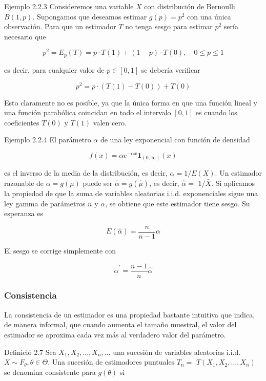 \documentclass[
]{article}
\begin{document}
Ejemplo 2.2.3 Consideremos una variable \(X\) con distribución de Bernoulli \(B(1, p)\). Supongamos que deseamos estimar \(g(p)=p^{2}\) con una única observación. Para que un estimador \(T\) no tenga sesgo para estimar \(p^{2}\) sería necesario que

\[
p^{2}=E_{p}(T)=p \cdot T(1)+(1-p) \cdot T(0), \quad 0 \leq p \leq 1
\]

es decir, para cualquier valor de \(p \in[0,1]\) se debería verificar

\[
p^{2}=p \cdot(T(1)-T(0))+T(0)
\]

Esto claramente no es posible, ya que la única forma en que una función lineal y una función parabólica coincidan en todo el intervalo \([0,1]\) es cuando los coeficientes \(T(0)\) y \(T(1)\) valen cero.

Ejemplo 2.2.4 El parámetro \(\alpha\) de una ley exponencial con función de densidad

\[
f(x)=\alpha e^{-\alpha x} \mathbf{1}_{(0, \infty)}(x)
\]

es el inverso de la media de la distribución, es decir, \(\alpha=1 / E(X)\).
Un estimador razonable de \(\alpha=g(\mu)\) puede ser \(\hat{\alpha}=g(\hat{\mu})\), es decir, \(\hat{\alpha}=\) \(1 / \bar{X}\). Si aplicamos la propiedad de que la suma de variables aleatorias i.i.d. exponenciales sigue una ley gamma de parámetros \(n\) y \(\alpha\), se obtiene que este estimador tiene sesgo. Su esperanza es

\[
E(\hat{\alpha})=\frac{n}{n-1} \alpha
\]

El sesgo se corrige simplemente con

\[
\hat{\alpha}^{\prime}=\frac{n-1}{n} \hat{\alpha}
\]

\subsubsection{Consistencia}\label{consistencia}

La consistencia de un estimador es una propiedad bastante intuitiva que indica, de manera informal, que cuando aumenta el tamaño muestral, el valor del estimador se aproxima cada vez más al verdadero valor del parámetro.

Definició 2.7 Sea \(X_{1}, X_{2}, \ldots, X_{n}, \ldots\) una sucesión de variables aleatorias i.i.d. \(X \sim F_{\theta}, \theta \in \Theta\). Una sucesión de estimadores puntuales \(T_{n}=\) \(T\left(X_{1}, X_{2}, \ldots, X_{n}\right)\) se denomina consistente para \(g(\theta)\) si
\end{document}
